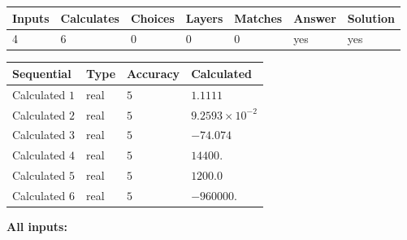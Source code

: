 \documentclass[12pt]{article}
\begin{document}
 
 
\noindent{}
 
 

 
\vspace{0.3in}
   
   
   
   
\noindent\begin{tabular}{|l|l|l|l|l|l|l|}
 \hline
Inputs & Calculates & Choices & Layers & Matches & Answer & Solution \\ \hline
           4  & 
           6  & 
           0
  & 
           0  & 
           0  & 
  yes & 
  yes 
  \\ \hline
 \end{tabular}
   
   
   
   
\noindent{}
   
   
  
  
\noindent\begin{tabular}{|l|l|l|l|}
\hline
 Sequential & Type & Accuracy & Calculated \\ 
\hline
 
 
  Calculated $            1 $ & real & $            5  $ & 
 $ 1.1111 $ 
 \\  \hline  
 
 
  Calculated $            2 $ & real & $            5  $ & 
 $ 9.2593 \times 10^{-2} $ 
 \\  \hline  
 
 
  Calculated $            3 $ & real & $            5  $ & 
 $ -74.074 $ 
 \\  \hline  
 
 
  Calculated $            4 $ & real & $            5  $ & 
 $ 14400. $ 
 \\  \hline  
 
 
  Calculated $            5 $ & real & $            5  $ & 
 $ 1200.0 $ 
 \\  \hline  
 
 
  Calculated $            6 $ & real & $            5  $ & 
 $ -960000. $ 
 \\  \hline  
 \end{tabular}
   
   
   
   
\noindent\vspace{0.1in}\hspace{-0.08in} {\textbf{\Large{All inputs: }}}
   
\end{document}
